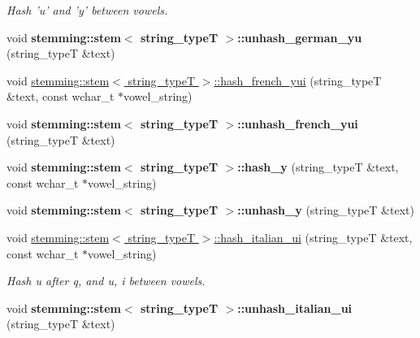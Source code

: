 \begin{DoxyCompactItemize}
\begin{DoxyCompactList}\small\item\em Hash 'u' and 'y' between vowels. \end{DoxyCompactList}\item 
\hypertarget{group___stemming_ga70ee7015775ebb7d8b98a1724f94448e}{void {\bfseries stemming\-::stem$<$ string\-\_\-type\-T $>$\-::unhash\-\_\-german\-\_\-yu} (string\-\_\-type\-T \&text)}\label{group___stemming_ga70ee7015775ebb7d8b98a1724f94448e}

\item 
void \hyperlink{group___stemming_ga0fa77155cef02f4efa2a537450ef4004}{stemming\-::stem$<$ string\-\_\-type\-T $>$\-::hash\-\_\-french\-\_\-yui} (string\-\_\-type\-T \&text, const wchar\-\_\-t $\ast$vowel\-\_\-string)
\item 
\hypertarget{group___stemming_ga11e5585424ce623ee7842a039bdfb7cb}{void {\bfseries stemming\-::stem$<$ string\-\_\-type\-T $>$\-::unhash\-\_\-french\-\_\-yui} (string\-\_\-type\-T \&text)}\label{group___stemming_ga11e5585424ce623ee7842a039bdfb7cb}

\item 
\hypertarget{group___stemming_gab7cc895f7a16b9bec4a4c4614111ecb3}{void {\bfseries stemming\-::stem$<$ string\-\_\-type\-T $>$\-::hash\-\_\-y} (string\-\_\-type\-T \&text, const wchar\-\_\-t $\ast$vowel\-\_\-string)}\label{group___stemming_gab7cc895f7a16b9bec4a4c4614111ecb3}

\item 
\hypertarget{group___stemming_gacc93df08d3d68d2468aa3e7cf23c7089}{void {\bfseries stemming\-::stem$<$ string\-\_\-type\-T $>$\-::unhash\-\_\-y} (string\-\_\-type\-T \&text)}\label{group___stemming_gacc93df08d3d68d2468aa3e7cf23c7089}

\item 
\hypertarget{group___stemming_ga11d05105fc3e03bd5f2ff581bc4eb6fe}{void \hyperlink{group___stemming_ga11d05105fc3e03bd5f2ff581bc4eb6fe}{stemming\-::stem$<$ string\-\_\-type\-T $>$\-::hash\-\_\-italian\-\_\-ui} (string\-\_\-type\-T \&text, const wchar\-\_\-t $\ast$vowel\-\_\-string)}\label{group___stemming_ga11d05105fc3e03bd5f2ff581bc4eb6fe}

\begin{DoxyCompactList}\small\item\em Hash u after q, and u, i between vowels. \end{DoxyCompactList}\item 
\hypertarget{group___stemming_gab4f2f7360665b96d941ba614dc3d5092}{void {\bfseries stemming\-::stem$<$ string\-\_\-type\-T $>$\-::unhash\-\_\-italian\-\_\-ui} (string\-\_\-type\-T \&text)}\label{group___stemming_gab4f2f7360665b96d941ba614dc3d5092}


\end{DoxyCompactItemize}
